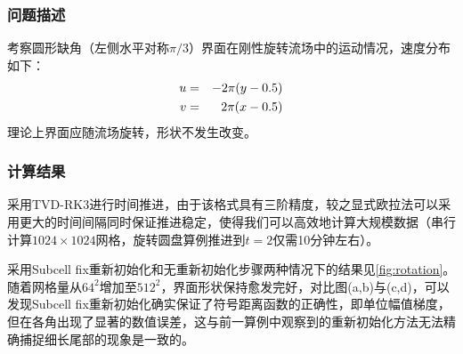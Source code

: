 \documentclass[11pt]{article}
\begin{document}
\subsubsection{问题描述}
考察圆形缺角（左侧水平对称$\pi/3$）界面在刚性旋转流场中的运动情况，速度分布如下：
\begin{eqnarray}
    u &=& -2\pi(y-0.5) \notag\\
    v &=& 2\pi(x-0.5)\notag
\end{eqnarray}
理论上界面应随流场旋转，形状不发生改变。

\subsubsection{计算结果}
采用TVD-RK3进行时间推进，由于该格式具有三阶精度，较之显式欧拉法可以采用更大的时间间隔同时保证推进稳定，使得我们可以高效地计算大规模数据（串行计算$1024\times1024$网格，旋转圆盘算例推进到$t=2$仅需10分钟左右）。

采用Subcell fix重新初始化和无重新初始化步骤两种情况下的结果见\autoref{fig:rotation}。随着网格量从$64^2$增加至$512^2$，界面形状保持愈发完好，对比图(a,b)与(c,d)，可以发现Subcell fix重新初始化确实保证了符号距离函数的正确性，即单位幅值梯度，但在各角出现了显著的数值误差，这与前一算例中观察到的重新初始化方法无法精确捕捉细长尾部的现象是一致的。
\end{document}
